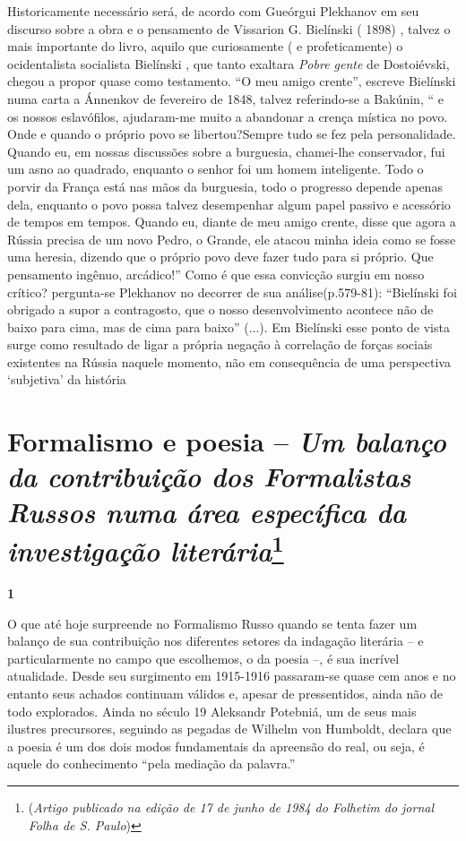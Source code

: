 Historicamente necessário será, de acordo com Gueórgui Plekhanov em seu
discurso sobre a obra e o pensamento de Vissarion G. Bielínski ( 1898) ,
talvez o mais importante do livro, aquilo que curiosamente ( e
profeticamente) o ocidentalista socialista Bielínski , que tanto
exaltara \emph{Pobre gente} de Dostoiévski, chegou a propor quase como
testamento. ``O meu amigo crente'', escreve Bielínski numa carta a
Ánnenkov de fevereiro de 1848, talvez referindo-se a Bakúnin, `` e os
nossos eslavófilos, ajudaram-me muito a abandonar a crença mística no
povo. Onde e quando o próprio povo se libertou?Sempre tudo se fez pela
personalidade. Quando eu, em nossas discussões sobre a burguesia,
chamei-lhe conservador, fui um asno ao quadrado, enquanto o senhor foi
um homem inteligente. Todo o porvir da França está nas mãos da
burguesia, todo o progresso depende apenas dela, enquanto o povo possa
talvez desempenhar algum papel passivo e acessório de tempos em tempos.
Quando eu, diante de meu amigo crente, disse que agora a Rússia precisa
de um novo Pedro, o Grande, ele atacou minha ideia como se fosse uma
heresia, dizendo que o próprio povo deve fazer tudo para si próprio. Que
pensamento ingênuo, arcádico!'' Como é que essa convicção surgiu em
nosso crítico? pergunta-se Plekhanov no decorrer de sua
análise(p.579-81): ``Bielínski foi obrigado a supor a contragosto, que o
nosso desenvolvimento acontece não de baixo para cima, mas de cima para
baixo'' (...). Em Bielínski esse ponto de vista surge como resultado de
ligar a própria negação à correlação de forças sociais existentes na
Rússia naquele momento, não em consequência de uma perspectiva
`subjetiva' da história

\chapter{Formalismo e poesia -- \emph{Um balanço da contribuição dos Formalistas Russos numa
área específica da investigação literária}\footnote{(\emph{Artigo
  publicado na edição de 17 de junho de 1984 do Folhetim do jornal Folha
  de S. Paulo})}}

\textbf{1}

O que até hoje surpreende no Formalismo Russo quando se tenta fazer um
balanço de sua contribuição nos diferentes setores da indagação
literária -- e particularmente no campo que escolhemos, o da poesia --,
é sua incrível atualidade. Desde seu surgimento em 1915-1916 passaram-se
quase cem anos e no entanto seus achados continuam válidos e, apesar de
pressentidos, ainda não de todo explorados. Ainda no século 19 Aleksandr
Potebniá, um de seus mais ilustres precursores, seguindo as pegadas de
Wilhelm von Humboldt, declara que a poesia é um dos dois modos
fundamentais da apreensão do real, ou seja, é aquele do conhecimento
``pela mediação da palavra.''

